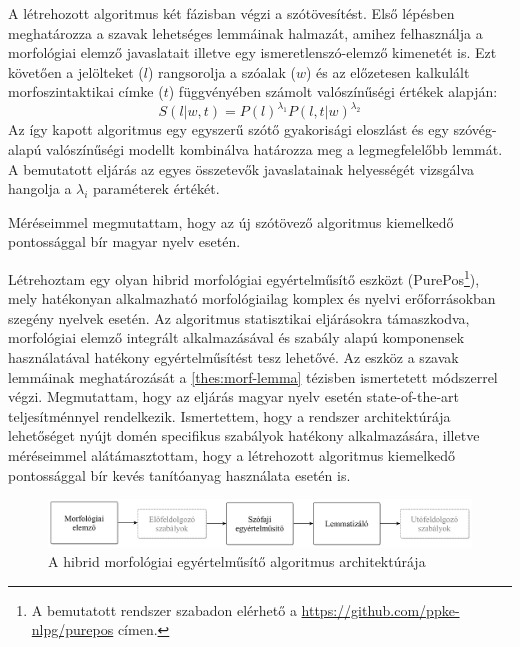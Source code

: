 A létrehozott algoritmus két fázisban végzi a szótövesítést. 
Első lépésben meghatározza a szavak lehetséges lemmáinak halmazát, amihez felhasználja a morfológiai elemző javaslatait illetve egy ismeretlenszó-elemző kimenetét is. 
Ezt követően a jelölteket ($l$)  rangsorolja a szóalak ($w$) és az előzetesen kalkulált morfoszintaktikai címke ($t$) függvényében számolt valószínűségi értékek alapján:
\begin{equation}\label{lemma-interpolated}
S(l|w,t) = P(l)^{\lambda_1} P(l,t|w)^{\lambda_2}
\end{equation}
Az így kapott algoritmus egy egyszerű szótő gyakorisági eloszlást és egy szóvég-alapú valószínűségi modellt kombinálva határozza meg a legmegfelelőbb lemmát.
A bemutatott eljárás az egyes összetevők javaslatainak helyességét vizsgálva hangolja a  $\lambda_i$ paraméterek értékét.

Méréseimmel megmutattam, hogy az új szótövező algoritmus kiemelkedő pontossággal bír magyar nyelv esetén. 

\thesisline%


\begin{core}
\begin{thesis}\label{thes:morf-tagging}
Létrehoztam egy olyan hibrid morfológiai egyértelműsítő eszközt (PurePos\footnote{A bemutatott rendszer szabadon elérhető a \href{https://github.com/ppke-nlpg/purepos}{https://github.com/ppke-nlpg/purepos} címen.}), mely hatékonyan alkalmazható  morfológiailag komplex és nyelvi erőforrásokban szegény nyelvek esetén. 
Az algoritmus statisztikai eljárásokra támaszkodva, morfológiai elemző integrált alkalmazásával és szabály alapú komponensek használatával hatékony egyértelműsítést tesz lehetővé. 
Az eszköz a szavak lemmáinak meghatározását a \ref{thes:morf-lemma} tézisben ismertetett módszerrel végzi.
Megmutattam, hogy az eljárás magyar nyelv esetén state-of-the-art teljesítménnyel rendelkezik.
Ismertettem, hogy a rendszer architektúrája lehetőséget nyújt domén specifikus szabályok hatékony alkalmazására, illetve méréseimmel alátámasztottam, hogy a létrehozott algoritmus kiemelkedő pontossággal bír kevés tanítóanyag használata esetén is.
\end{thesis}

\begin{pub}
\cite{Orosz2011,Orosz2012,Orosz2012a,Orosz2013a}
\end{pub}
\end{core}

\begin{figure}[H] 
  \centering
  \includegraphics[width=1\textwidth]{MorphTagging/architecture_hu.png} 
  \caption{A hibrid morfológiai egyértelműsítő algoritmus architektúrája}
  \label{fig:purepos-arch_hu}
\end{figure}

